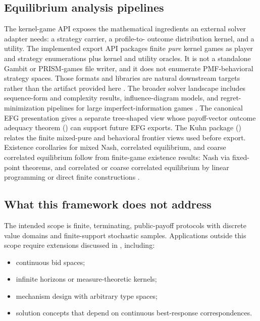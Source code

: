\subsection{Equilibrium analysis pipelines}

The kernel-game API exposes the mathematical ingredients an
external solver adapter needs: a strategy carrier, a profile-to-
outcome distribution kernel, and a utility.  The implemented export
API packages finite \emph{pure} kernel games as player and
strategy enumerations plus kernel and utility oracles.  It is not a
standalone Gambit or PRISM-games file writer, and it does not
enumerate PMF-behavioral strategy spaces.  Those formats and libraries
are natural downstream targets rather than the artifact provided here
\citep{McKelveyMcLennanTurocy2006Gambit,
KwiatkowskaNormanParkerSantos2020PRISMGames,
LanctotEtAl2019OpenSpiel}.  The broader solver landscape includes
sequence-form and complexity results, influence-diagram models, and
regret-minimization pipelines for large imperfect-information games
\citep{KollerMegiddo1992,koller2003multi,Zinkevich2007CFR,
Bowling2015Heads-up,Brown2018Libratus}.  The canonical EFG presentation
gives a separate tree-shaped view whose payoff-vector outcome adequacy
theorem () can support future EFG exports.  The Kuhn
package
()
relates the finite mixed-pure and behavioral frontier views used before
export.  Existence corollaries for
mixed Nash, correlated equilibrium, and coarse correlated equilibrium
follow from finite-game existence results: Nash via fixed-point
theorems, and correlated or coarse correlated equilibrium by linear
programming or direct finite constructions
\citep{Nash1951,Aumann1974}.

\subsection{What this framework does not address}

The intended scope is finite, terminating, public-payoff protocols
with discrete value domains and finite-support stochastic samples.
Applications outside this scope require extensions discussed in
, including:
\begin{itemize}\itemsep1pt
\item continuous bid spaces;
\item infinite horizons or measure-theoretic kernels;
\item mechanism design with arbitrary type spaces;
\item solution concepts that depend on continuous best-response
  correspondences.
\end{itemize}

